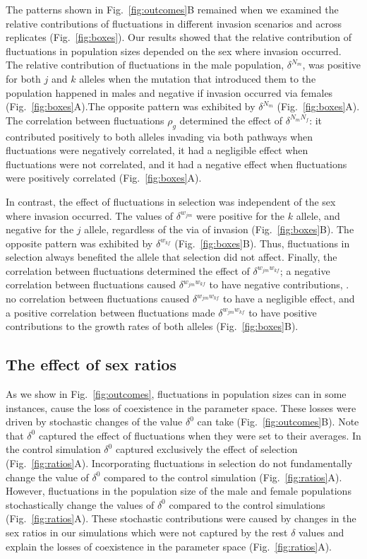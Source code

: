 \documentclass[12pt]{article}
\begin{document}
 The patterns shown in Fig.~\ref{fig:outcomes}B remained when we examined the relative contributions of fluctuations in different invasion scenarios and across replicates (Fig.~\ref{fig:boxes}). Our results showed that the relative contribution of fluctuations in population sizes depended on the sex where invasion occurred. The relative contribution of fluctuations in the male population, $\delta^{N_{m}}$,  was positive for both $j$ and $k$ alleles when the mutation that introduced them to the population happened in males and negative if invasion occurred via females (Fig.~\ref{fig:boxes}A).The opposite pattern was exhibited by  $\delta^{N_{m}}$ (Fig.~\ref{fig:boxes}A). The correlation between fluctuations $\rho_{g}$ determined the effect of  $\delta^{N_{m}N_{f}}$: it contributed positively to both alleles invading via both pathways when fluctuations were negatively correlated, it had a negligible effect when fluctuations were not correlated, and it had a negative effect when fluctuations were positively correlated (Fig.~\ref{fig:boxes}A).

 In contrast, the effect of fluctuations in selection was independent of the sex where invasion occurred. The values of $\delta^{w_{jm}}$ were positive for the $k$ allele,  and negative  for the $j$ allele, regardless of the via of invasion (Fig.~\ref{fig:boxes}B). The opposite pattern was exhibited by $\delta^{w_{kf}}$ (Fig.~\ref{fig:boxes}B). Thus, fluctuations in selection always benefited the allele that selection did not affect. Finally, the correlation between fluctuations determined the effect of $\delta^{w_{jm}w_{kf}}$;  a negative correlation between fluctuations caused $\delta^{w_{jm}w_{kf}}$ to have negative contributions, . no correlation between fluctuations caused $\delta^{w_{jm}w_{kf}}$ to have a negligible effect, and a positive correlation between fluctuations made $\delta^{w_{jm}w_{kf}}$ to have positive contributions to the growth rates of both alleles (Fig.~\ref{fig:boxes}B).



\subsection*{The effect of sex ratios}

As we show in Fig.~\ref{fig:outcomes}, fluctuations in population sizes can in some instances, cause the loss of coexistence in the parameter space. These losses were driven by stochastic changes of the value $\delta^{0}$ can take (Fig.~\ref{fig:outcomes}B). Note that $\delta^{0}$  captured the effect of fluctuations when they were set to their averages. In the control simulation $\delta^{0}$ captured exclusively the effect of selection (Fig.~\ref{fig:ratios}A). Incorporating fluctuations in selection do not fundamentally change the value of $\delta^{0}$ compared to the control simulation (Fig.~\ref{fig:ratios}A). However, fluctuations in the population size of the male and female populations stochastically change the values of $\delta^{0}$ compared to the control simulations (Fig.~\ref{fig:ratios}A). These stochastic contributions were caused by changes in the sex ratios in our simulations which were not captured by the rest  $\delta$ values and explain the losses of coexistence in the parameter space (Fig.~\ref{fig:ratios}A).
\clearpage
\end{document}
